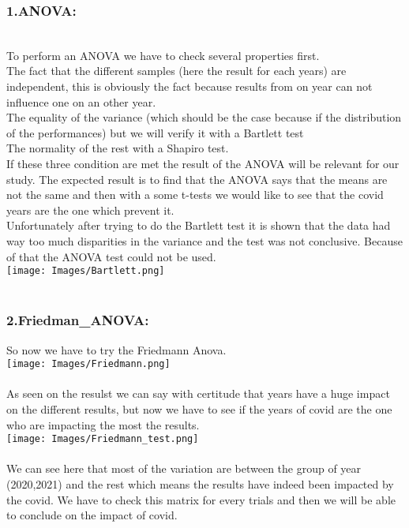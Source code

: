 \documentclass[
	12pt, %
]{fphw_assignment_toc}
\begin{document}
\subsubsection{\large\bf 1.ANOVA: }
\\
To perform an ANOVA we have to check several properties first. 
\\
The fact that the different samples (here the result for each years) are independent, this is obviously the fact because results from on year can not influence one on an other year. 
\\
The equality of the variance (which should be the case because if the distribution of the performances) but we will verify it with a Bartlett test 
\\
The normality of the rest with a Shapiro test.
\\
If these three condition are met the result of the ANOVA will be relevant for our study.
The expected result is to find that the ANOVA says that the means are not the same and then with a some t-tests we would like to see that the covid years are the one which prevent it.
\\
Unfortunately after trying to do the Bartlett test it is shown that the data had way too much disparities in the variance and the test was not conclusive. Because of that the ANOVA test could not be used.
\bigskip
\\
\texttt{[image: Images/Bartlett.png]}
\\
\bigskip
\\
\newpage
\subsubsection{\large\bf 2.Friedman_ANOVA: }

So now we have to try the Friedmann Anova.
\bigskip
\\
\texttt{[image: Images/Friedmann.png]}
\\
\bigskip
\\
As seen on the resulst we can say with certitude that years have a huge impact on the different results, but now we have to see if the years of covid are the one who are impacting the most the results.
\bigskip
\\
\texttt{[image: Images/Friedmann\_test.png]}
\\
\bigskip
\\
We can see here that most of the variation are between the group of year (2020,2021) and the rest which means the results have indeed been impacted by the covid. We have to check this matrix for every trials and then we will be able to conclude on the impact of covid.
\\
\end{document}
